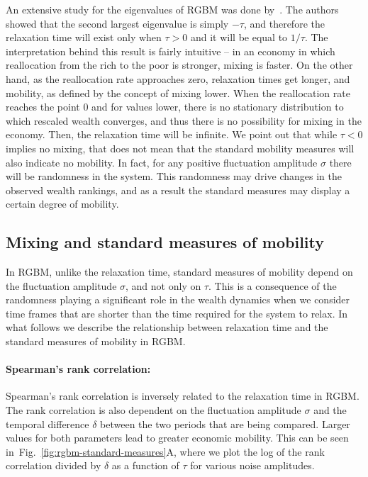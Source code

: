 \documentclass[11pt]{article}
\newcommand{\fref}[1]{Fig.~\ref{fig:#1}}
\numberwithin{equation}{section}
\begin{document}
An extensive study for the eigenvalues of RGBM was done by~\cite{LiuSerota2017}. The authors showed that the second largest eigenvalue is simply $-\tau$, and therefore the relaxation time will exist only when $\tau > 0$ and it will be equal to $1/\tau$. The interpretation behind this result is fairly intuitive -- in an economy in which reallocation from the rich to the poor is stronger, mixing is faster. On the other hand, as the reallocation rate approaches zero, relaxation times get longer, and mobility, as defined by the concept of mixing lower. When the reallocation rate reaches the point $0$ and for values lower, there is no stationary distribution to which rescaled wealth converges, and thus there is no possibility for mixing in the economy. Then, the relaxation time will be infinite. We point out that while $\tau <0$ implies no mixing, that does not mean that the standard mobility measures will also indicate no mobility. In fact, for any positive fluctuation amplitude $\sigma$ there will be randomness in the system. This randomness may drive changes in the observed wealth rankings, and as a result the standard measures may display a certain degree of mobility.


\subsection{Mixing and standard measures of mobility}\label{sec:measures}

In RGBM, unlike the relaxation time, standard measures of mobility depend on the fluctuation amplitude $\sigma$, and not only on $\tau$. This is a consequence of the randomness playing a significant role in the wealth dynamics when we consider time frames that are shorter than the time required for the system to relax. In what follows we describe the relationship between relaxation time and the standard measures of mobility in RGBM.

\paragraph{Spearman's rank correlation:} Spearman's rank correlation is inversely related to the relaxation time in RGBM. The rank correlation is also dependent on the fluctuation amplitude $\sigma$ and the temporal difference $\delta$ between the two periods that are being compared. Larger values for both parameters lead to greater economic mobility. This can be seen in~\fref{rgbm-standard-measures}A, where we plot the log of the rank correlation divided by $\delta$ as a function of $\tau$ for various noise amplitudes.
\end{document}
